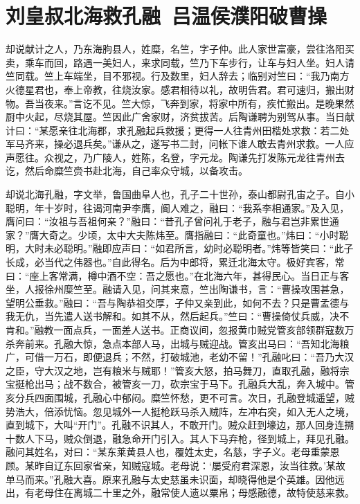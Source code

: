 \chapter{刘皇叔北海救孔融~吕温侯濮阳破曹操}

却说献计之人，乃东海朐县人，姓糜，名竺，字子仲。此人家世富豪，尝往洛阳买卖，乘车而回，路遇一美妇人，来求同载，竺乃下车步行，让车与妇人坐。妇人请竺同载。竺上车端坐，目不邪视。行及数里，妇人辞去；临别对竺曰：“我乃南方火德星君也，奉上帝教，往烧汝家。感君相待以礼，故明告君。君可速归，搬出财物。吾当夜来。”言讫不见。竺大惊，飞奔到家，将家中所有，疾忙搬出。是晚果然厨中火起，尽烧其屋。竺因此广舍家财，济贫拔苦。后陶谦聘为别驾从事。当日献计曰：“某愿亲往北海郡，求孔融起兵救援；更得一人往青州田楷处求救：若二处军马齐来，操必退兵矣。”谦从之，遂写书二封，问帐下谁人敢去青州求救。一人应声愿往。众视之，乃广陵人，姓陈，名登，字元龙。陶谦先打发陈元龙往青州去讫，然后命糜竺赍书赴北海，自己率众守城，以备攻击。

却说北海孔融，字文举，鲁国曲阜人也，孔子二十世孙，泰山都尉孔宙之子。自小聪明，年十岁时，往谒河南尹李膺，阍人难之，融曰：“我系李相通家。”及入见，膺问曰：“汝祖与吾祖何亲？”融曰：“昔孔子曾问礼于老子，融与君岂非累世通家？”膺大奇之。少顷，太中大夫陈炜至。膺指融曰：“此奇童也。”炜曰：“小时聪明，大时未必聪明。”融即应声曰：“如君所言，幼时必聪明者。”炜等皆笑曰：“此子长成，必当代之伟器也。”自此得名。后为中郎将，累迁北海太守。极好宾客，常曰：“座上客常满，樽中酒不空：吾之愿也。”在北海六年，甚得民心。当日正与客坐，人报徐州糜竺至。融请入见，问其来意，竺出陶谦书，言：“曹操攻围甚急，望明公垂救。”融曰：“吾与陶恭祖交厚，子仲又亲到此，如何不去？只是曹孟德与我无仇，当先遣人送书解和。如其不从，然后起兵。”竺曰：“曹操倚仗兵威，决不肯和。”融教一面点兵，一面差人送书。正商议间，忽报黄巾贼党管亥部领群寇数万杀奔前来。孔融大惊，急点本部人马，出城与贼迎战。管亥出马曰：“吾知北海粮广，可借一万石，即便退兵；不然，打破城池，老幼不留！”孔融叱曰：“吾乃大汉之臣，守大汉之地，岂有粮米与贼耶！”管亥大怒，拍马舞刀，直取孔融，融将宗宝挺枪出马；战不数合，被管亥一刀，砍宗宝于马下。孔融兵大乱，奔入城中。管亥分兵四面围城，孔融心中郁闷。糜竺怀愁，更不可言。次日，孔融登城遥望，贼势浩大，倍添忧恼。忽见城外一人挺枪跃马杀入贼阵，左冲右突，如入无人之境，直到城下，大叫“开门”。孔融不识其人，不敢开门。贼众赶到壕边，那人回身连搠十数人下马，贼众倒退，融急命开门引入。其人下马弃枪，径到城上，拜见孔融。融问其姓名，对曰：“某东莱黄县人也，覆姓太史，名慈，字子义。老母重蒙恩顾。某昨自辽东回家省亲，知贼寇城。老母说：‘屡受府君深恩，汝当往救。’某故单马而来。”孔融大喜。原来孔融与太史慈虽未识面，却晓得他是个英雄。因他远出，有老母住在离城二十里之外，融常使人遗以粟帛；母感融德，故特使慈来救。

